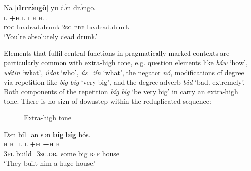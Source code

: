 \ea%
    \label{ex:key:62}
    \glll   Na  [\textbf{drrrɔ́ngò}]    yu  dɔ́n  drɔ́ngo. \\
\textsc{l}  \textbf{\textsc{+h}}\textsc{.l}        \textsc{l}  \textsc{h}  \textsc{h.l}\\
\textsc{foc}  be.dead.drunk  \textsc{2sg}  \textsc{prf}  be.dead.drunk\\
\glt ‘You’re absolutely dead drunk.’     
\z

Elements that fulfil central functions in pragmatically marked contexts are particularly common with extra-high tone, e.g. question elements like \textit{háw} ‘how’, \textit{wétin} ‘what’, \textit{údat} ‘who’, \textit{ús=tín}  ‘what’, the negator \textit{nó}, modifications of degree via repetition like \textit{bíg bíg} ‘very big’, and the degree adverb \textit{bád} ‘bad, extremely’. Both components of the repetition \textit{bíg bíg} ‘be very big’ in   carry an extra-high tone. There is no sign of downstep within the reduplicated sequence: 

\begin{figure}
\caption{Extra-high tone}
\label{fig:key:3.24}
\end{figure}
 


\ea%
    \label{ex:key:63}
    \glll   Dɛn    bíl=an    sɔn    \textbf{bíg}  \textbf{bíg}    hós.\\
\textsc{h}    \textsc{h=l}      \textsc{l}    \textbf{\textsc{+h}  \textbf{\textsc{+h}}}    \textsc{h}\\
\textsc{3pl}    build=\textsc{3sg.obj}  some  big  \textsc{rep}    house\\
\glt ‘They built him a huge house.’    
\z

